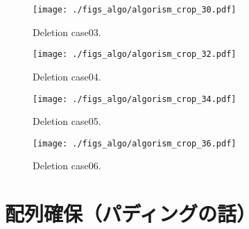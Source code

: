 \begin{figure}[h]
  \vspace{-0.5cm}
  \texttt{[image: ./figs\_algo/algorism\_crop\_30.pdf]}
  \caption{
    Deletion case03.
  }
  \label{fig_IpCHashT_deletion_case03}
  \vspace{-0.5cm}
\end{figure}

\begin{figure}[h]
  \vspace{-0.5cm}
  \texttt{[image: ./figs\_algo/algorism\_crop\_32.pdf]}
  \caption{
    Deletion case04.
  }
  \label{fig_IpCHashT_deletion_case04}
  \vspace{-0.5cm}
\end{figure}

\begin{figure}[h]
  \vspace{-0.5cm}
  \texttt{[image: ./figs\_algo/algorism\_crop\_34.pdf]}
  \caption{
    Deletion case05.
  }
  \label{fig_IpCHashT_deletion_case05}
  \vspace{-0.5cm}
\end{figure}

\begin{figure}[h]
  \vspace{-0.5cm}
  \texttt{[image: ./figs\_algo/algorism\_crop\_36.pdf]}
  \caption{
    Deletion case06.
  }
  \label{fig_IpCHashT_deletion_case05}
  \vspace{-0.5cm}
\end{figure}

\section{配列確保（パディングの話）}









